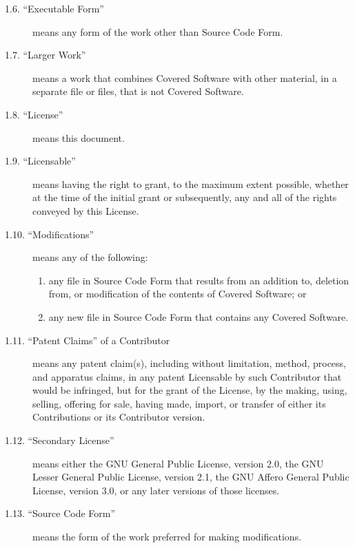 \documentclass[letterpaper,10pt,english]{sphinxmanual}
\begin{document}
\begin{description}
\begin{enumerate}
\end{enumerate}

\item[{1.6. “Executable Form”}] \leavevmode
means any form of the work other than Source Code Form.

\item[{1.7. “Larger Work”}] \leavevmode
means a work that combines Covered Software with other material, in
a separate file or files, that is not Covered Software.

\item[{1.8. “License”}] \leavevmode
means this document.

\item[{1.9. “Licensable”}] \leavevmode
means having the right to grant, to the maximum extent possible,
whether at the time of the initial grant or subsequently, any and
all of the rights conveyed by this License.

\item[{1.10. “Modifications”}] \leavevmode
means any of the following:
\begin{enumerate}
\def\theenumi{\alph{enumi}}
\def\labelenumi{(\theenumi )}
\makeatletter\def\p@enumii{\p@enumi (\theenumi )}\makeatother
\item {} 
any file in Source Code Form that results from an addition to,
deletion from, or modification of the contents of Covered
Software; or

\item {} 
any new file in Source Code Form that contains any Covered
Software.

\end{enumerate}

\item[{1.11. “Patent Claims” of a Contributor}] \leavevmode
means any patent claim(s), including without limitation, method,
process, and apparatus claims, in any patent Licensable by such
Contributor that would be infringed, but for the grant of the
License, by the making, using, selling, offering for sale, having
made, import, or transfer of either its Contributions or its
Contributor version.

\item[{1.12. “Secondary License”}] \leavevmode
means either the GNU General Public License, version 2.0, the GNU
Lesser General Public License, version 2.1, the GNU Affero General
Public License, version 3.0, or any later versions of those
licenses.

\item[{1.13. “Source Code Form”}] \leavevmode
means the form of the work preferred for making modifications.


\end{description}
\end{document}
